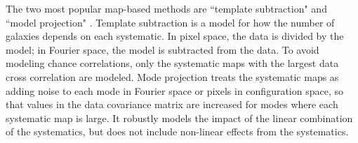 \documentclass[a4paper,fleqn,usenatbib]{mnras}
\begin{document}
The two most popular map-based methods are ``template subtraction" \citep{sdss1Systematics, myers06, sdss8Systematics, sdss8Companion, sdss9Systematics, sdss12Systematics, wigglezSelectionFunc, delubacSystematics, qsoDepthExtinction, prakashRegressionTech, myersRegressionTech, elvinpoole} and ``model projection" \citep{rybicki92, tegmark98, uros04, biasInTemplateMethod, leistedt13}. Template subtraction is a model for how the number of galaxies depends on each systematic. In pixel space, the data is divided by the model; in Fourier space, the model is subtracted from the data. To avoid modeling chance correlations, only the systematic maps with the largest data cross correlation are modeled. Mode projection treats the systematic maps as adding noise to each mode in Fourier space or pixels in configuration space, so that values in the data covariance matrix are increased for modes where each systematic map is large. It robustly models the impact of the linear combination of the systematics, but does not include non-linear effects from the systematics. 
\end{document}
